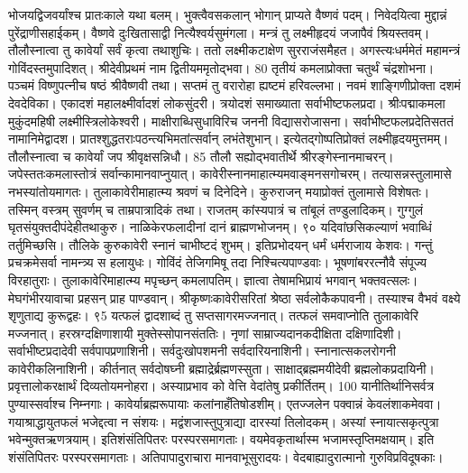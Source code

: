 भोजयद्विजवर्यांश्च प्रातःकाले यथा बलम्।
 भुक्त्वैवसकलान् भोगान् प्राप्यते वैष्णवं पदम्।
 निवेदयित्वा मुद्दान्नं पुरेंद्राणीसहाईकम्।
 वैष्णवे दुःखितासाद्वी नित्यैश्वर्यसुमंगला।
 मन्त्रं तु लक्ष्मीहृदयं जजापैवं श्रियस्तवम्।
 तौलौस्नात्वा तु कावेर्यां सर्वं कृत्वा तथाशुचिः।
 ततो लक्ष्मीकटाक्षेण सुरराजंसमैहत।
 अगस्त्यःधर्ममेतं महामन्त्रं गोविंदस्तमुपादिशत्।
 श्रीदेवीप्रथमं नाम द्वितीयममृतोद्भवा।
 80 तृतीयं कमलाप्रोक्ता चतुर्थं चंद्रशोभना।
 पञ्चमं विष्णुपत्नीच षष्ठं श्रीवैष्णवी तथा।
 सप्तमं तु वरारोहा ह्यष्टमं हरिवल्लभा।
 नवमं शाङ्गिणीप्रोक्ता दशमं देवदेविका।
 एकादशं महालक्ष्मीर्वादशं लोकसुंदरी।
 त्रयोदशं समाख्याता सर्वाभीष्टफलप्रदा।
 श्रीःपद्माकमला मुकुंदमहिषी लक्ष्मीस्त्रिलोकेश्वरी।
 माक्षीराब्धिसुधाविरिच जननी विद्यासरोजासना।
 सर्वाभीष्टफलप्रदेतिसततं नामानिमेद्वादश।
 प्रातश्शुद्धतराःपठन्त्यभिमतांत्सर्वान् लभंतेशुभान्।
 इत्येतद्गोष्पतिप्रोक्तं लक्ष्मीहृदयमुत्तमम्।
 तौलौस्नात्वा च कावेर्यां जप श्रीवृक्षसन्निधौ।
 85
तौलौ सह्योद्भवातीर्थे श्रीरङ्गेस्नानमाचरन्।
 जपेस्ततःकमलास्तोत्रं सर्वान्कामानवाप्नुयात्।
 कावेरीस्नानमाहात्म्यमवाङ्मनसगोचरम्।
 तत्यासन्नस्तुलामासे नभस्यांतोयमागतः।
 तुलाकावेरीमाहात्म्य श्रवणं च दिनेदिने।
 कुरुराजन् मयाप्रोक्तं तुलामासे विशेषतः।
 तस्मिन् वस्त्रम् सुवर्णम् च ताम्रपात्रादिकं तथा।
 राजतम् कांस्यपात्रं च तांबूलं तण्डुलादिकम्।
 गुग्गुलं घृतसंयुक्तदीपंदेहीतथाकुरु।
 नाळिकेरफलादीनां दानं ब्राह्मणभोजनम्।
 ९० यदिवांछसिकल्याणं भवाब्धिं तर्तुमिच्छसि।
 तौलिके कुरुकावेरी स्नानं चाभीष्टदं शुभम्।
 इतिप्रभोदयन् धर्मं धर्मराजाय केशवः।
 गन्तुं प्रचक्रमेसर्वा नामन्त्र्य स हलायुधः।
 गोविंदं तेजिगमिषू तदा निश्चित्यपाण्डवाः।
 भूषणांबररत्नौवै संपूज्य विरहातुराः।
 तुलाकावेरिमाहात्म्य मपृच्छन् कमलापतिम्।
 ज्ञात्वा तेषामभिप्रायं भगवान् भक्तवत्सलः।
 मेघगंभीरयावाचा प्रहसन् प्राह पाण्डवान्।
 श्रीकृष्णःकावेरीसरितां श्रेष्ठा सर्वलोकैकपावनी।
 तस्याश्च वैभवं वक्ष्ये शृणुताद्य कुरूद्वहः।
 ९5
यत्फलं द्वादशाब्दं तु सप्तसागरमज्जनात्।
 तत्फलं समवाप्नोति तुलाकावेरि मज्जनात्।
 हरस्रग्दक्षिणाशायी मुक्तेस्सोपानसंततिः।
 नृणां साम्राज्यदानकदीक्षिता दक्षिणादिशी।
 सर्वाभीष्टप्रदादेवी सर्वपापप्रणाशिनी।
 सर्वदुःखोपशमनी सर्वदारियनाशिनी।
 स्नानात्सकलरोगनी कावेरीकलिनाशिनी।
 कीर्तनात् सर्वदोषघ्नी ब्रह्माद्रेर्ब्रह्मणस्सुता।
 साक्षाद्ब्रह्ममयीदेवी ब्रह्मलोकप्रदायिनी।
 प्रवृत्तालोकरक्षार्थं दिव्यतोयमनोहरा।
 अस्याप्रभाव को वेत्ति वेदांतेषु प्रकीर्तितम्।
 100 यानीतिर्थानिसर्वत्र पुण्यास्सर्वाश्च निम्नगाः।
 कावेर्याब्रह्मरूपायाः कलांनाहँतिषोडशीम्।
 एतज्जलेन पक्वान्नं केवलंशाकमेववा।
 गयाश्राद्धायुतफलं भजेद्दत्वा न संशयः।
 मद्वंशजास्तुपुत्राद्या दारस्यां तिलोदकम्।
 अस्यां स्नायात्सकृत्पुत्रा भवेन्मुक्तऋणत्रयाम्।
 इतिशंसंतिपितरः परस्परसमागताः।
 वयमेवकृतार्थास्म भजामस्तृप्तिमक्षयाम्।
 इति शंसंतिपितरः परस्परसमागताः।
 अतिपापादुराचारा मानवाभूसुरादयः।
 वेदबाह्यादुरात्मानो गुरुविप्रविदूषकाः।
 
